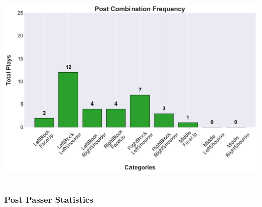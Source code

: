 \documentclass[a4paper,12pt]{article}
\begin{document}
\begin{table}[H]
{\begin{minipage}[t]{0.6\textwidth}
{\begin{tabular}
            
                
            
                
            


            \bottomrule
        \end{tabular}
        } %
    \end{minipage}
    } %
    \hfill %
    \begin{minipage}[c]{0.35\textwidth} %
        \flushright
        \includegraphics[width=\textwidth, height=.14\textheight]{images/Post_Combination_Freq.png} %
    \end{minipage}
\end{table}

\vspace{0em} %
\hrule height 1pt width 1\textwidth %
\vspace{1em} %

\subsubsection{Post Passer Statistics}

\vspace{-1em} %
\end{document}
